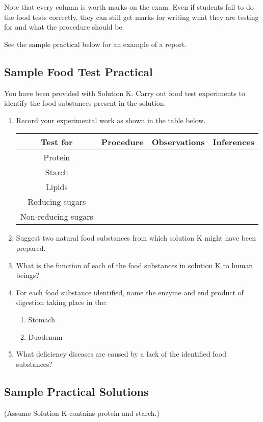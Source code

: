 \begin{itemize}
Note that every column is worth marks on the exam. Even if students fail to do the food tests correctly, they can still get marks for writing what they are testing for and what the procedure should be.

See the sample practical below for an example of a report.

\subsection{Sample Food Test Practical}

You have been provided with Solution K. Carry out food test experiments to identify the food substances present in the solution.
\begin{enumerate}

\item{Record your experimental work as shown in the table below.}

\begin{center}
\begin{tabular}{ | c | c | c | c |}
\hline
Test for & Procedure & Observations & Inferences\\ \hline
Protein & & & \\ \hline
Starch & & & \\ \hline
Lipids & & & \\ \hline
Reducing sugars & & & \\ \hline
Non-reducing sugars & & & \\ \hline
\hline
\end{tabular}
\end{center}

\item{Suggest two natural food substances from which solution K might have been prepared.}
\item{What is the function of each of the food substances in solution K to human beings?}
\item{For each food substance identified, name the enzyme and end product of digestion taking place in the:}
\begin{enumerate}
\item{Stomach}
\item{Duodenum}
\end{enumerate}
\item{What deficiency diseases are caused by a lack of the identified food substances?}
\end{enumerate}

\subsection{Sample Practical Solutions}
(Assume Solution K contains protein and starch.)


\end{itemize}
